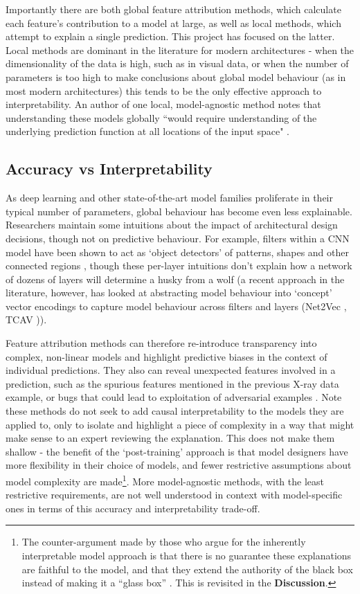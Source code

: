 \documentclass[main]{subfiles}
\begin{document}
Importantly there are both global feature attribution methods, which calculate each feature's contribution to a model at large, as well as local methods, which attempt to explain a single prediction. This project has focused on the latter. Local methods are dominant in the literature for modern architectures - when the dimensionality of the data is high, such as in visual data, or when the number of parameters is too high to make conclusions about global model behaviour (as in most modern architectures) this tends to be the only effective approach to interpretability. An author of one local, model-agnostic method notes that understanding these models globally ``would require understanding of the underlying prediction function at all locations of the input space" \cite{local}. 

\subsection*{Accuracy vs Interpretability}

As deep learning and other state-of-the-art model families proliferate in their typical number of parameters, global behaviour has become even less explainable. Researchers maintain some intuitions about the impact of architectural design decisions, though not on predictive behaviour. For example, filters within a CNN model have been shown to act as `object detectors' of patterns, shapes and other connected regions \cite{objectdetect}, though these per-layer intuitions don't explain how a network of dozens of layers will determine a husky from a wolf (a recent approach in the literature, however, has looked at abstracting model behaviour into `concept' vector encodings to capture model behaviour across  filters and layers (Net2Vec \cite{net2vec}, TCAV \cite{tcav})).

Feature attribution methods can therefore re-introduce transparency into complex, non-linear models and highlight predictive biases in the context of individual predictions. They also can reveal unexpected features involved in a prediction, such as the spurious features mentioned in the previous X-ray data example, or bugs that could lead to exploitation of adversarial examples \cite{adversary}. Note these methods do not seek to add causal interpretability to the models they are applied to, only to isolate and highlight a piece of complexity in a way that might make sense to an expert reviewing the explanation. This does not make them shallow - the benefit of the `post-training' approach is that model designers have more flexibility in their choice of models, and fewer restrictive assumptions about model complexity are made\footnote{The counter-argument made by those who argue for the inherently interpretable model approach is that there is no guarantee these explanations are faithful to the model, and that they extend the authority of the black box instead of making it a ``glass box'' \cite{rudin}. This is revisited in the \textbf{Discussion}.}. More model-agnostic methods, with the least restrictive requirements, are not well understood in context with model-specific ones in terms of this accuracy and interpretability trade-off.
\end{document}
